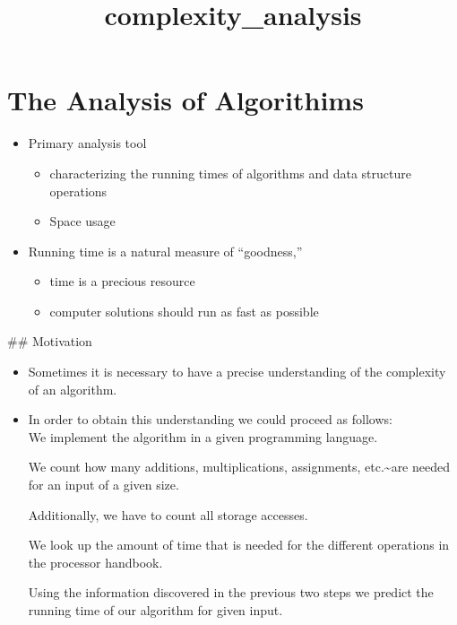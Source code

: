 \documentclass[11pt]{article}
\title{complexity\_analysis}
\providecommand{\tightlist}{%
      \setlength{\itemsep}{0pt}\setlength{\parskip}{0pt}}
\begin{document}
    
    \maketitle
    
    

    
    \hypertarget{the-analysis-of-algorithims}{%
\section{The Analysis of
Algorithims}\label{the-analysis-of-algorithims}}

\begin{itemize}
\tightlist
\item
  Primary analysis tool

  \begin{itemize}
  \tightlist
  \item
    characterizing the running times of algorithms and data structure
    operations
  \item
    Space usage\\
  \end{itemize}
\item
  Running time is a natural measure of ``goodness,''

  \begin{itemize}
  \tightlist
  \item
    time is a precious resource
  \item
    computer solutions should run as fast as possible
  \end{itemize}
\end{itemize}

    \#\# Motivation

\begin{itemize}
\item
  Sometimes it is necessary to have a precise understanding of the
  complexity of an algorithm.
\item
  In order to obtain this understanding we could proceed as follows:\\

  We implement the algorithm in a given programming language.

  We count how many additions, multiplications, assignments,
  etc.\textasciitilde are needed for an input of a given size.

  Additionally, we have to count all storage accesses.

  We look up the amount of time that is needed for the different
  operations in the processor handbook.

  Using the information discovered in the previous two steps we predict
  the running time of our algorithm for given input.
\end{itemize}
\end{document}
